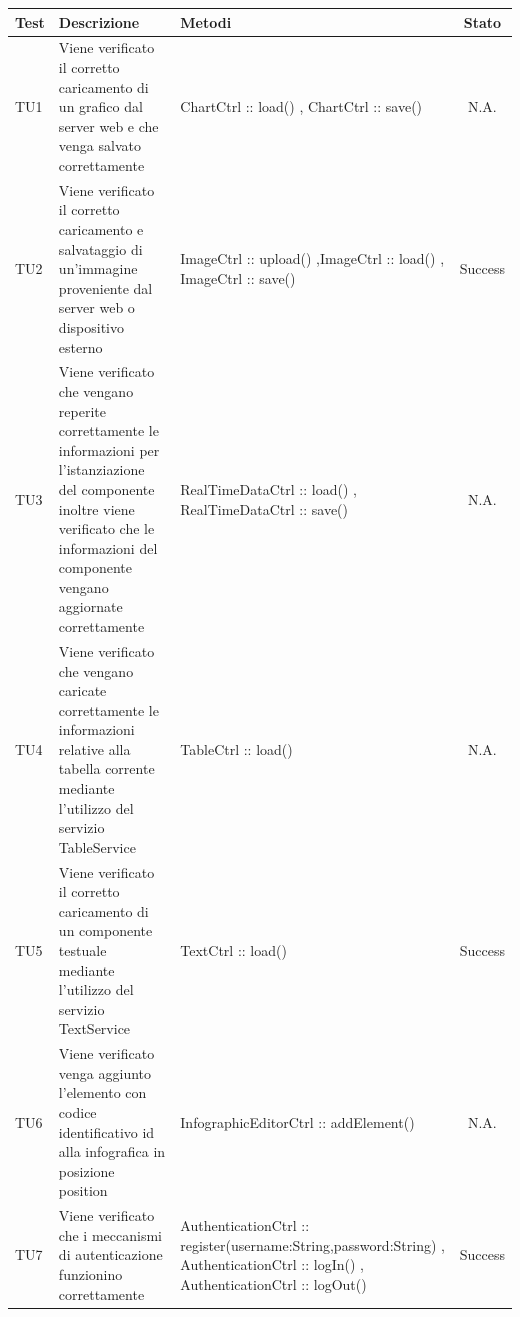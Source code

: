 \begin{table}[h]
	\begin{center}
	\begin{tabular}{|l|p{}|p{}|c|}
	\toprule
		\textbf{Test} & \textbf{Descrizione} & \textbf{Metodi} & \textbf{Stato}\\
		
	\midrule
		TU1 & Viene verificato il corretto caricamento di un grafico dal server web e che venga salvato correttamente & ChartCtrl :: load() , ChartCtrl :: save() & N.A.\\
	\midrule
		TU2 & Viene verificato il corretto caricamento e salvataggio di un'immagine proveniente dal server web o dispositivo esterno & ImageCtrl :: upload() ,ImageCtrl :: load() , ImageCtrl :: save() & Success\\
	\midrule
		TU3 & Viene verificato che vengano reperite correttamente le informazioni per l'istanziazione del componente inoltre viene verificato che le informazioni del componente vengano aggiornate correttamente & RealTimeDataCtrl :: load() , RealTimeDataCtrl :: save() & N.A.\\
	\midrule
		TU4 & Viene verificato che vengano caricate correttamente le informazioni relative alla tabella corrente mediante  l'utilizzo del servizio  TableService & TableCtrl :: load() & N.A.\\
	\midrule
		TU5 & Viene verificato il corretto caricamento di un componente testuale  mediante l'utilizzo del servizio
TextService & TextCtrl :: load() & Success\\
	\midrule
		TU6 & Viene verificato venga aggiunto l'elemento con codice identificativo id alla infografica
in posizione position & InfographicEditorCtrl :: addElement() & N.A.\\
	\midrule
		TU7 & Viene verificato che i meccanismi di autenticazione funzionino correttamente & AuthenticationCtrl :: register(username:String,password:String) , AuthenticationCtrl :: logIn() , AuthenticationCtrl :: logOut() & Success\\
\bottomrule
\end{tabular}
\end{center}
\end{table}

